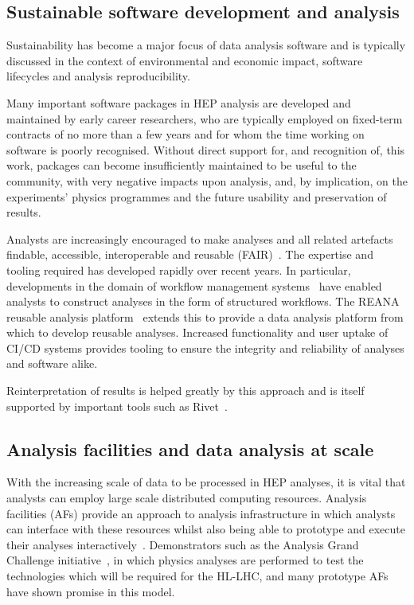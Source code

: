 \documentclass[10pt,a4paper]{article}
\begin{document}
\subsection{Sustainable software development and
analysis}\label{sustainable-software-development-and-analysis}

Sustainability has become a major focus of data analysis software and is
typically discussed in the context of environmental and economic impact,
software lifecycles and analysis reproducibility.

Many important software packages in HEP analysis are developed and
maintained by early career researchers, who are typically employed on
fixed-term contracts of no more than a few years and for whom the time
working on software is poorly recognised. Without direct support for,
and recognition of, this work, packages can become insufficiently
maintained to be useful to the community, with very negative
impacts upon analysis, and, by implication, on the experiments' physics
programmes and the future usability and preservation of results.

Analysts are increasingly encouraged to make analyses and all related artefacts
findable, accessible, interoperable and reusable
(FAIR)~\cite{wilkinson_fair_2016, Chen_2022, Duarte:2022job, FAIR4AIWorkshop}. The
expertise and tooling required has developed rapidly over recent years. In
particular, developments in the domain of workflow management
systems~\cite{cwl,snakemake,luigilaw,yadage} have enabled analysts to construct
analyses in the form of structured workflows. The REANA reusable analysis
platform~\cite{REANA} extends this to provide a data analysis platform from
which to develop reusable analyses. Increased functionality and user uptake of
CI/CD systems provides tooling to ensure the integrity and reliability of
analyses and software alike.

Reinterpretation of results is helped greatly by this approach and is itself
supported by important tools such as Rivet~\cite{10.21468/SciPostPhys.8.2.026}.

\subsection{Analysis facilities and data analysis at
scale}\label{analysis-facilities-and-data-analysis-at-scale}

With the increasing scale of data to be processed in HEP analyses, it is
vital that analysts can employ large scale distributed computing resources.
Analysis facilities (AFs) provide an approach to analysis infrastructure in
which analysts can interface with these resources whilst also being able to
prototype and execute their analyses interactively~\cite{WLCG:ana_fac_wp}. Demonstrators
such as the Analysis Grand Challenge
initiative~\cite{Held:2022RC}, in which physics analyses
are performed to test the technologies which will be required for the HL-LHC,
and many prototype AFs have shown promise in this model.
\end{document}
